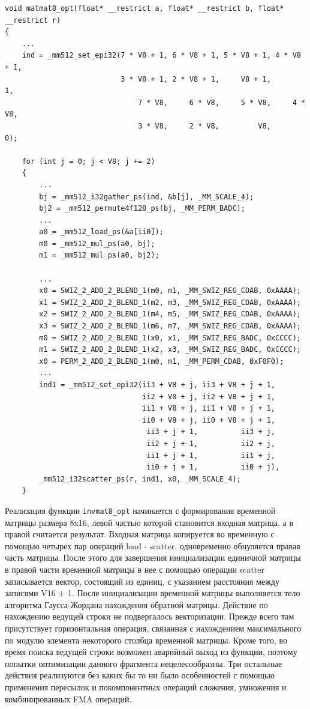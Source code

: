 \begin{lstlisting}[caption={caption}, label={label}]
void matmat8_opt(float* __restrict a, float* __restrict b, float* __restrict r)
{
	...
    ind = _mm512_set_epi32(7 * V8 + 1, 6 * V8 + 1, 5 * V8 + 1, 4 * V8 + 1,
                           3 * V8 + 1, 2 * V8 + 1,     V8 + 1,          1,
                               7 * V8,     6 * V8,     5 * V8,     4 * V8,
                               3 * V8,     2 * V8,         V8,          0);

    for (int j = 0; j < V8; j += 2)
    {
        ...
        bj = _mm512_i32gather_ps(ind, &b[j], _MM_SCALE_4);
        bj2 = _mm512_permute4f128_ps(bj, _MM_PERM_BADC);
        ...
        a0 = _mm512_load_ps(&a[ii0]);
        m0 = _mm512_mul_ps(a0, bj);
        m1 = _mm512_mul_ps(a0, bj2);

        ...
        x0 = SWIZ_2_ADD_2_BLEND_1(m0, m1, _MM_SWIZ_REG_CDAB, 0xAAAA);
        x1 = SWIZ_2_ADD_2_BLEND_1(m2, m3, _MM_SWIZ_REG_CDAB, 0xAAAA);
        x2 = SWIZ_2_ADD_2_BLEND_1(m4, m5, _MM_SWIZ_REG_CDAB, 0xAAAA);
        x3 = SWIZ_2_ADD_2_BLEND_1(m6, m7, _MM_SWIZ_REG_CDAB, 0xAAAA);
        m0 = SWIZ_2_ADD_2_BLEND_1(x0, x1, _MM_SWIZ_REG_BADC, 0xCCCC);
        m1 = SWIZ_2_ADD_2_BLEND_1(x2, x3, _MM_SWIZ_REG_BADC, 0xCCCC);
        x0 = PERM_2_ADD_2_BLEND_1(m0, m1, _MM_PERM_CDAB, 0xF0F0);
        ...
        ind1 = _mm512_set_epi32(ii3 + V8 + j, ii3 + V8 + j + 1,
                                ii2 + V8 + j, ii2 + V8 + j + 1,
                                ii1 + V8 + j, ii1 + V8 + j + 1,
                                ii0 + V8 + j, ii0 + V8 + j + 1,
                                 ii3 + j + 1,          ii3 + j,
                                 ii2 + j + 1,          ii2 + j,
                                 ii1 + j + 1,          ii1 + j,
                                 ii0 + j + 1,          ii0 + j),
        _mm512_i32scatter_ps(r, ind1, x0, _MM_SCALE_4);
    }
\end{lstlisting}

Реализация функции \texttt{invmat8\_opt} начинается с формирования временной матрицы размера 8x16, левой частью которой становится входная матрица, а в правой считается результат.
Входная матрица копируется во временную с помощью четырех пар операций load - scatter, одновременно обнуляется правая часть матрицы. 
После этого для завершения инициализации единичной матрицы в правой части временной матрицы в нее с помощью операции scatter записывается вектор, состоящий из единиц, с указанием расстояния между записями V16 + 1.
После инициализации временной матрицы выполняется тело алгоритма Гаусса-Жордана нахождения обратной матрицы.
Действие по нахождению ведущей строки не подвергалось векторизации. Прежде всего там присутствует горизонтальная операция, связанная с нахождением максимального по модулю элемента некоторого столбца временной матрицы.
Кроме того, во время поиска ведущей строки возможен аварийный выход из функции, поэтому попытки оптимизации данного фрагмента нецелесообразны.
Три остальные действия реализуются без каких бы то ни было особенностей с помощью применения пересылок и покомпонентных операций сложения, умножения и комбинированных FMA операций.

